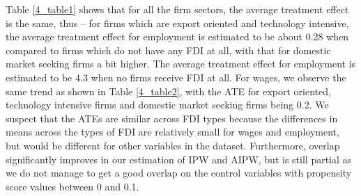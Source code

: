 



Table \ref{4_table1} shows that for all the firm sectors, the average treatment effect is the same, thus – for firms which are export oriented and technology intensive, the average treatment effect for employment is estimated to be about 0.28 when compared to firms which do not have any FDI at all, with that for domestic market seeking firms a bit higher. The average treatment effect for employment is estimated to be 4.3 when no firms receive FDI at all. For wages, we observe the same trend as shown in Table \ref{4_table2}, with the ATE for export oriented,  technology intensive firms and domestic market seeking firms being 0.2. We suspect that the ATEs are similar across FDI types because the differences in means across the types of FDI are relatively small for wages and employment, but would be different for other variables in the dataset. Furthermore, overlap significantly improves in our estimation of IPW and AIPW, but is still partial as we do not manage to get a good overlap on the control variables with propensity score values between 0 and 0.1.